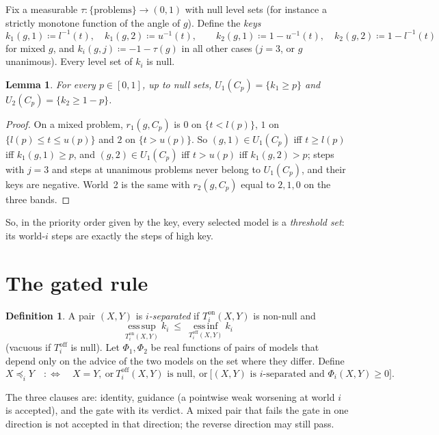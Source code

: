 \documentclass[11pt]{article}
\newtheorem{lemma}[theorem]{Lemma}
\theoremstyle{definition}\newtheorem{definition}[theorem]{Definition}
\theoremstyle{remark}\newtheorem{remark}[theorem]{Remark}
\newcommand{\on}{\mathrm{on}}
\newcommand{\off}{\mathrm{off}}
\newcommand{\esssup}{\operatorname*{ess\,sup}}
\newcommand{\essinf}{\operatorname*{ess\,inf}}
\begin{document}
Fix a measurable $\tau\colon\{\text{problems}\}\to(0,1)$ with null level sets
(for instance a strictly monotone function of the angle of $g$). Define the
\emph{keys}
\[
 k_1(g,1)\coloneqq l^{-1}(t),\quad k_1(g,2)\coloneqq u^{-1}(t),\qquad
 k_2(g,1)\coloneqq 1-u^{-1}(t),\quad k_2(g,2)\coloneqq 1-l^{-1}(t)
\]
for mixed $g$, and $k_i(g,j)\coloneqq-1-\tau(g)$ in all other cases ($j=3$, or
$g$ unanimous). Every level set of $k_i$ is null.

\begin{lemma}\label{lem:threshold}
For every $p\in[0,1]$, up to null sets,
$U_1(C_p)=\{k_1\ge p\}$ and $U_2(C_p)=\{k_2\ge1-p\}$.
\end{lemma}
\begin{proof}
On a mixed problem, $r_1(g,C_p)$ is $0$ on $\{t<l(p)\}$, $1$ on
$\{l(p)\le t\le u(p)\}$ and $2$ on $\{t>u(p)\}$. So $(g,1)\in U_1(C_p)$ iff
$t\ge l(p)$ iff $k_1(g,1)\ge p$, and $(g,2)\in U_1(C_p)$ iff $t>u(p)$ iff
$k_1(g,2)>p$; steps with $j=3$ and steps at unanimous problems never belong to
$U_1(C_p)$, and their keys are negative. World~2 is the same with
$r_2(g,C_p)$ equal to $2,1,0$ on the three bands.
\end{proof}

So, in the priority order given by the key, every selected model is a
\emph{threshold set}: its world-$i$ steps are exactly the steps of high key.

\section{The gated rule}\label{sec:rule}

\begin{definition}\label{def:rule}
A pair $(X,Y)$ is \emph{$i$-separated} if $T^\on_i(X,Y)$ is non-null and
\[
 \esssup_{T^\on_i(X,Y)}k_i\ \le\ \essinf_{T^\off_i(X,Y)}k_i
\]
(vacuous if $T^\off_i$ is null). Let $\Phi_1,\Phi_2$ be real functions of
pairs of models that depend only on the advice of the two models on the set
where they differ. Define
\[
 X\preceq_iY\quad:\Longleftrightarrow\quad X=Y,\ \text{or}\ T^\off_i(X,Y)
 \text{ is null},\ \text{or}\ \bigl[(X,Y)\text{ is $i$-separated and }
 \Phi_i(X,Y)\ge0\bigr].
\]
\end{definition}

The three clauses are: identity, guidance (a pointwise weak worsening at world
$i$ is accepted), and the gate with its verdict. A mixed pair that fails the
gate in one direction is not accepted in that direction; the reverse
direction may still pass.
\end{document}
